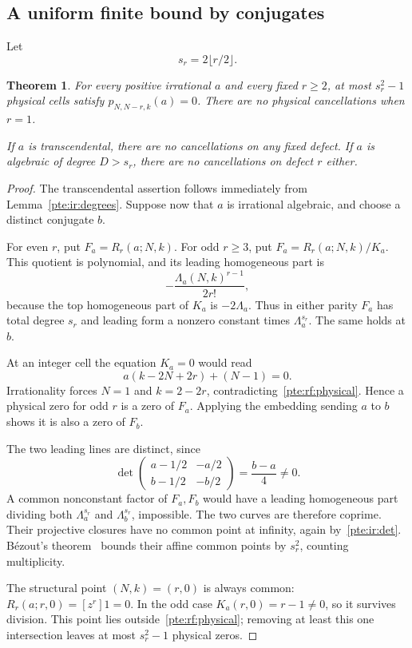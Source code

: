 \documentclass[11pt,a4paper]{article}
\numberwithin{equation}{section}
\newtheorem{theorem}{Theorem}[section]
\theoremstyle{definition}
\theoremstyle{plain}
\begin{document}
\subsection{A uniform finite bound by conjugates}
Let
\[
 s_r=2\lfloor r/2\rfloor.
\]
\begin{theorem}\label{pte:ir:main}
For every positive irrational $a$ and every fixed $r\ge2$, at most $s_r^2-1$ physical cells satisfy $p_{N,N-r,k}(a)=0$. There are no physical cancellations when $r=1$.

If $a$ is transcendental, there are no cancellations on any fixed defect. If $a$ is algebraic of degree $D>s_r$, there are no cancellations on defect $r$ either.
\end{theorem}
\begin{proof}
The transcendental assertion follows immediately from Lemma~\ref{pte:ir:degrees}. Suppose now that $a$ is irrational algebraic, and choose a distinct conjugate $b$.

For even $r$, put $F_a=R_r(a;N,k)$. For odd $r\ge3$, put $F_a=R_r(a;N,k)/K_a$. This quotient is polynomial, and its leading homogeneous part is
\[
 -\frac{\Lambda_a(N,k)^{r-1}}{2r!},
\]
because the top homogeneous part of $K_a$ is $-2\Lambda_a$. Thus in either parity $F_a$ has total degree $s_r$ and leading form a nonzero constant times $\Lambda_a^{s_r}$. The same holds at $b$.

At an integer cell the equation $K_a=0$ would read
\[
 a(k-2N+2r)+(N-1)=0.
\]
Irrationality forces $N=1$ and $k=2-2r$, contradicting~\eqref{pte:rf:physical}. Hence a physical zero for odd $r$ is a zero of $F_a$. Applying the embedding sending $a$ to $b$ shows it is also a zero of $F_b$.

The two leading lines are distinct, since
\begin{equation}\label{pte:ir:det}
 \det\begin{pmatrix}a-1/2&-a/2\\ b-1/2&-b/2\end{pmatrix}
 =\frac{b-a}{4}\ne0.
\end{equation}
A common nonconstant factor of $F_a,F_b$ would have a leading homogeneous part dividing both $\Lambda_a^{s_r}$ and $\Lambda_b^{s_r}$, impossible. The two curves are therefore coprime. Their projective closures have no common point at infinity, again by~\eqref{pte:ir:det}. B\'ezout's theorem~\cite[I, Theorem 1.18]{pte-milne} bounds their affine common points by $s_r^2$, counting multiplicity.

The structural point $(N,k)=(r,0)$ is always common: $R_r(a;r,0)=[z^r]1=0$. In the odd case $K_a(r,0)=r-1\ne0$, so it survives division. This point lies outside~\eqref{pte:rf:physical}; removing at least this one intersection leaves at most $s_r^2-1$ physical zeros.


\end{proof}
\end{document}
